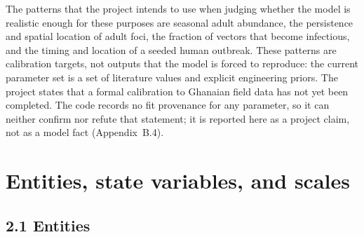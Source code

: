 \documentclass[11pt,a4paper]{article}
\begin{document}
The patterns that the project intends to use when judging whether the
model is realistic enough for these purposes are seasonal adult
abundance, the persistence and spatial location of adult foci, the
fraction of vectors that become infectious, and the timing and location
of a seeded human outbreak. These patterns are calibration targets, not
outputs that the model is forced to reproduce: the current parameter set
is a set of literature values and explicit engineering priors. The
project states that a formal calibration to Ghanaian field data has not
yet been completed. The code records no fit provenance for any
parameter, so it can neither confirm nor refute that statement; it is
reported here as a project claim, not as a model fact
(Appendix~B.4).

\section{Entities, state variables, and scales}

\subsection*{2.1 Entities}
\end{document}
